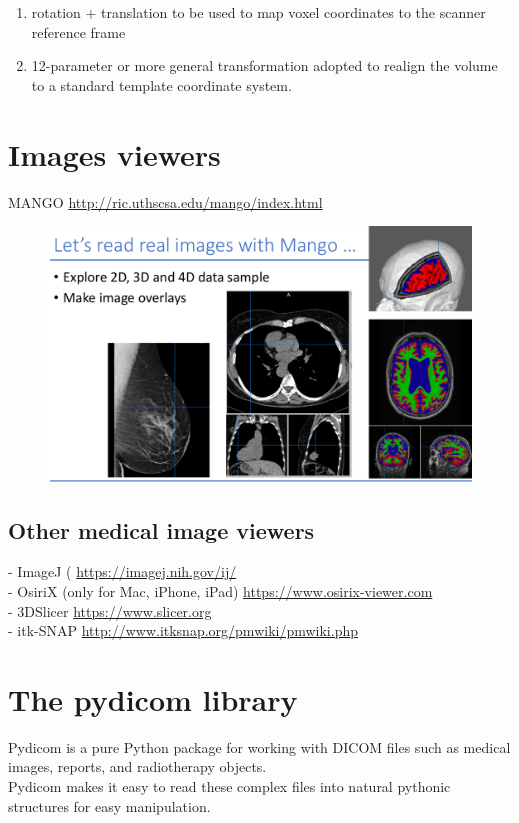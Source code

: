 \begin{enumerate}
	\item rotation + translation to be used to map voxel coordinates to the scanner reference frame
	\item 12-parameter or more general transformation adopted to realign the volume to a standard template coordinate system.
\end{enumerate}

\section{Images viewers}

MANGO \url{http://ric.uthscsa.edu/mango/index.html}

\begin{figure}[ht]
	\centering
	\includegraphics[width=0.9\linewidth]{figure_med/mango}
\end{figure}
\FloatBarrier

\subsection{Other medical image viewers}
- ImageJ ( \url{https://imagej.nih.gov/ij/}\\
- OsiriX (only for Mac, iPhone, iPad) \url{https://www.osirix-viewer.com}\\
- 3DSlicer \url{https://www.slicer.org}\\
- itk-SNAP  \url{http://www.itksnap.org/pmwiki/pmwiki.php}

\section{The pydicom library}

Pydicom is a pure Python package for working with DICOM files such as medical images, reports, and radiotherapy objects.\\
Pydicom makes it easy to read these complex files into natural pythonic structures for easy manipulation.\\

